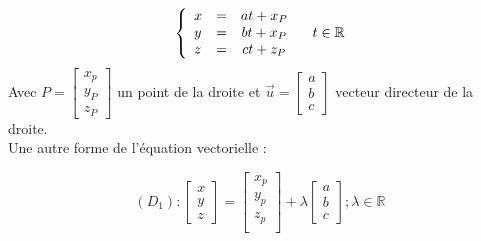 \begin{eqnarray}
\left\{
\begin{array}{l c c r}   
x &=& a t+ x_P &\\
y &=& b t+ x_P & \\
z &=& c t + z_P & 
\end{array}\right.
t \in \mathbb{R}
\end{eqnarray}
Avec 
$P=
\begin{bmatrix}
x_p \\
y_P\\
z_P
\end{bmatrix}
$ 
un point de la droite et $\vec{u}=\begin{bmatrix}
a\\ b\\ c
\end{bmatrix}$ vecteur directeur de la droite.\\

Une autre forme de l'équation vectorielle :

\begin{equation}
(D_1):
\begin{bmatrix}
x \\
y\\
z
\end{bmatrix}
=
\begin{bmatrix}
x_p\\
y_p\\
z_p\\
\end{bmatrix}
+
\lambda
\begin{bmatrix}
a\\
b \\
c
\end{bmatrix}
; \lambda \in \mathbb{R}
\end{equation}
